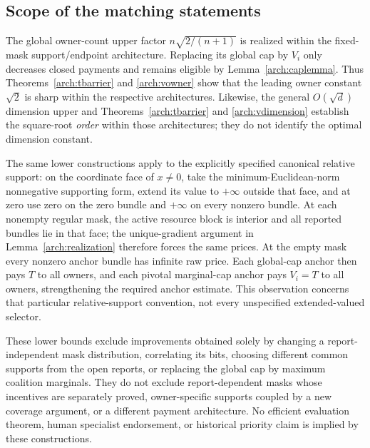 \documentclass[11pt]{article}
\theoremstyle{definition}\newtheorem{definition}[theorem]{Definition}
\theoremstyle{remark}\newtheorem{remark}[theorem]{Remark}
\begin{document}
\subsection{Scope of the matching statements}

The global owner-count upper factor $n\sqrt{2/(n+1)}$ is realized within
the fixed-mask support/endpoint architecture. Replacing its global cap by
$V_i$ only decreases closed payments and remains eligible by
Lemma~\ref{arch:caplemma}. Thus Theorems~\ref{arch:tbarrier} and
\ref{arch:vowner} show that the leading owner constant $\sqrt2$ is sharp
within the respective architectures. Likewise, the general
$O(\sqrt d)$ dimension upper and Theorems~\ref{arch:tbarrier} and
\ref{arch:vdimension} establish the square-root \emph{order} within those
architectures; they do not identify the optimal dimension constant.

The same lower constructions apply to the explicitly specified canonical
relative support: on the coordinate face of $x\ne0$, take the
minimum-Euclidean-norm nonnegative supporting form, extend its value to
$+\infty$ outside that face, and at zero use zero on the zero bundle and
$+\infty$ on every nonzero bundle. At each nonempty regular mask, the active
resource block is interior and all reported bundles lie in that face;
the unique-gradient argument in Lemma~\ref{arch:realization} therefore
forces the same prices. At the empty mask every nonzero anchor bundle has
infinite raw price. Each global-cap anchor then pays $T$ to all owners,
and each pivotal marginal-cap anchor pays $V_i=T$ to all owners, strengthening
the required anchor estimate. This observation concerns that particular
relative-support convention, not every unspecified extended-valued selector.

These lower bounds exclude improvements obtained solely by changing a
report-independent mask distribution, correlating its bits, choosing different
common supports from the open reports, or replacing the global cap by
maximum coalition marginals. They do not exclude report-dependent masks
whose incentives are separately proved, owner-specific supports coupled by
a new coverage argument, or a different payment architecture. No efficient
evaluation theorem, human specialist endorsement, or historical priority
claim is implied by these constructions.
\end{document}
